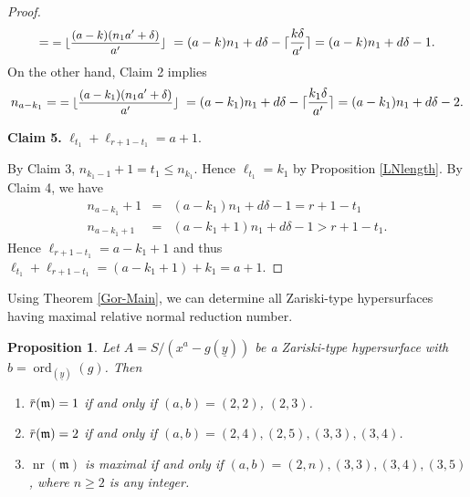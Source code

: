\documentclass[12pt]{amsart}
\newtheorem{prop}[thm]{Proposition}
\theoremstyle{definition}
\theoremstyle{remark}
\numberwithin{equation}{section}
\newcommand{\m}{{\mathfrak m}}
\DeclareMathOperator{\nr}{{nr}}
\DeclareMathOperator{\ord}{ord}
\newcommand{\ol}[1]{\mkern 1.5mu\overline{\mkern-1.5mu#1\mkern-1.5mu}\mkern 1.5mu} %
\begin{document}
\begin{proof}
\[= \text{\small %
$= \lfloor \frac{(a-k)(n_1a'+\delta)}{a'} \rfloor$ } 
= (a-k)n_1 + d \delta - \lceil \frac{k\delta}{a'} \rceil 
= (a-k)n_1 + d \delta-1. 
\]
On the other hand, Claim 2 implies 
\[
n_{a-k_1} 
=  \text{\small %
$= \lfloor \frac{(a-k_1)(n_1a'+\delta)}{a'} \rfloor $ }
= (a-k_1)n_1 + d \delta - \lceil \frac{k_1\delta}{a'} \rceil 
= (a-k_1)n_1 + d \delta-2. 
\]
\par \vspace{2mm} \par \noindent 
{\bf Claim 5.} $\ell_{t_1}+\ell_{r+1-t_1}=a+1$. 
 \par \vspace{2mm}
By Claim 3, $n_{k_1-1}+1=t_1 \le n_{k_1}$. 
Hence $\ell_{t_1}=k_1$ by Proposition \ref{LNlength}. 
By Claim 4, we have 
\begin{eqnarray*}
n_{a-k_1}+1 &=& (a-k_1)n_1+d\delta-1 = r+1-t_1 \\[2mm]
n_{a-k_1+1} &=& (a-k_1+1)n_1+d\delta-1 > r+1-t_1. 
\end{eqnarray*}
Hence $\ell_{r+1-t_1}=a-k_1+1$ and thus 
$\ell_{t_1}+\ell_{r+1-t_1}=(a-k_1+1)+k_1=a+1$.  
\end{proof}


\par 
Using Theorem \ref{Gor-Main}, we can determine all Zariski-type hypersurfaces having maximal relative normal reduction number.  

\begin{prop} \label{Hyp_Maximal}
Let $A=S/(x^a-g(\underline{y}))$ be a Zariski-type hypersurface with 
$b=\ord_{(\underline{y})}(g)$. 
Then 
\begin{enumerate}
\item[(a)] $\ol{r}(\m)=1$ if and only if $(a,b)=(2,2)$, $(2,3)$. 
\item[(b)] $\ol{r}(\m)=2$ if and only if $(a,b)=(2,4),(2,5),(3,3),(3,4)$. 
\item[(c)] $\nr(\m)$ is maximal if and only if $(a,b)=(2,n),(3,3),(3,4),(3,5)$, where $n \ge 2$ is any integer. 
\end{enumerate}
\end{prop}
\end{document}
